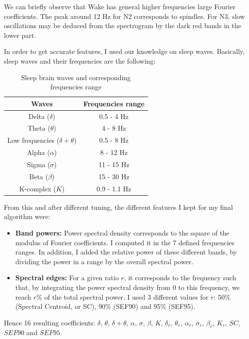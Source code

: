 \documentclass[12pt]{report}
\begin{document}
We can briefly observe that Wake has general higher frequencies large Fourier coefficients. The peak around 12 Hz for N2 corresponds to spindles. For N3, slow oscillations may be deduced from the spectrogram by the dark red bands in the lower part.

In order to get accurate features, I used our knowledge on sleep waves. Basically, sleep waves and their frequencies are the following:

\begin{table}[H]
\centering
\begin{tabular}{c|c}
Waves & Frequencies range \\\hline
Delta ($\delta$) & 0.5 - 4 Hz \\
Theta ($\theta$) & 4 - 8 Hz \\
Low frequencies ($\delta+\theta$) & 0.5 - 8 Hz \\
Alpha ($\alpha$) & 8 - 12 Hz \\
Sigma ($\sigma$) & 11 - 15 Hz \\
Beta ($\beta$) & 15 - 30 Hz \\
K-complex ($K$) & 0.9 - 1.1 Hz \\
\end{tabular}
\caption{\label{tab:waves_freq}Sleep brain waves and corresponding frequencies range}
\end{table}

From this and after different tuning, the different features I kept for my final algorithm were:
\begin{itemize}
\item \textbf{Band powers:} Power spectral density corresponds to the square of the modulus of Fourier coefficients. I computed it in the 7 defined frequencies ranges. In addition, I added the relative power of these different bands, by dividing the power in a range by the overall spectral power.
\item \textbf{Spectral edges:} For a given ratio $r$, it corresponds to the frequency such that, by integrating the power spectral density from 0 to this frequency, we reach $r$\% of the total spectral power. I used 3 different values for $r$: 50\% (Spectral Centroid, or SC), 90\% (SEF90) and 95\% (SEF95).
\end{itemize}

Hence 16 resulting coefficients: $\delta$, $\theta$, $\delta+\theta$, $\alpha$, $\sigma$, $\beta$, $K$, $\delta_r$, $\theta_r$, $\alpha_r$, $\sigma_r$, $\beta_r$, $K_r$, $SC$, $SEF90$ and $SEF95$.
\end{document}
